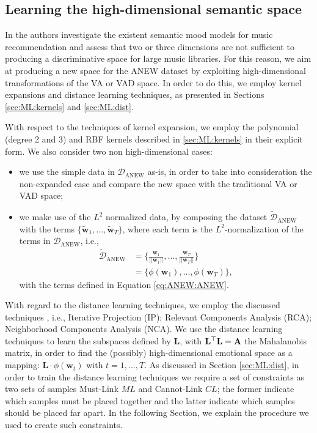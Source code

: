 \subsection{Learning the high-dimensional semantic space}
\label{sec:ANEW:moodtag}
In \cite{Barthet2013DesignAE} the authors investigate the existent semantic mood models for music recommendation and assess that two or three dimensions are not sufficient to producing a discriminative space for large music libraries. For this reason, we aim at producing a new space for the ANEW dataset by exploiting high-dimensional transformations of the VA or VAD space. In order to do this, we employ kernel expansions and distance learning techniques, as presented in Sections \ref{sec:ML:kernels} and \ref{sec:ML:dist}.

With respect to the techniques of kernel expansion, we employ the polynomial (degree 2 and 3) and RBF kernels described in \ref{sec:ML:kernels} in their explicit form. We also consider two non high-dimensional cases:
\begin{itemize}
\item we use the simple data in $\mathcal{D}_{\text{ANEW}}$ as-is, in order to take into consideration the non-expanded case and compare the new space with the traditional VA or VAD space;
\item we make use of the $L^2$ normalized data, by composing the dataset $\tilde{\mathcal{D}}_{\text{ANEW}}$ with the terms $\{\tilde{\mathbf{w}}_1,..., \tilde{\mathbf{w}}_T \}$, where each term is the $L^2$-normalization of the terms in $\mathcal{D}_{\text{ANEW}}$, i.e., 
\begin{equation}
\begin{split}
\tilde{\mathcal{D}}_{\text{ANEW}} &=\{ \frac{\mathbf{w}_1}{||\mathbf{w}_1||},..., \frac{\mathbf{w}_T}{||\mathbf{w}_T||}  \}\\
&=\{\phi(\mathbf{w}_1), ..., \phi(\mathbf{w}_T)   \},
\end{split}
\end{equation}
with the terms defined in Equation \ref{eq:ANEW:ANEW}.
\end{itemize}

With regard to the distance learning techniques, we employ the discussed techniques \cite{Carey2015}, i.e., Iterative Projection\cite{xing2003distance} (IP); Relevant Components Analysis \cite{bar2003learning} (RCA); Neighborhood Components Analysis \cite{goldberger2004neighbourhood} (NCA). We use the distance learning techniques to learn the subspaces defined by $\mathbf{L}$, with $\mathbf{L}^\top \mathbf{L}=\mathbf{A}$ the Mahalanobis matrix, in order to find the (possibly) high-dimensional emotional space as a mapping: $\mathbf{L} \cdot \phi ( \mathbf{w}_t) $ with $t=1,...,T$. As discussed in Section \ref{sec:ML:dist}, in order to train the distance learning techniques we require a set of constraints as two sets of samples Must-Link $ML$ and Cannot-Link $CL$; the former indicate which samples must be placed together and the latter indicate which samples should be placed far apart. In the following Section, we explain the procedure we used to create such constraints.

